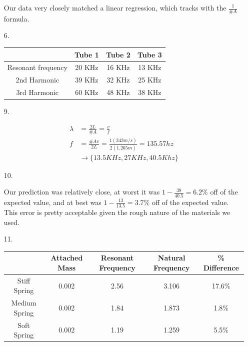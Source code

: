 \documentclass[12pt, letterpaper]{article}
\begin{document}
\begin{itemize}
        Our data very closely matched a linear regression, which tracks with the $\frac{1}{\#A}$ formula.

        \pagebreak
        
        \item [6.]\mbox{}
        
        \begin{center}
            \begin{tabular}{|c|c|c|c|}
                \hline
                & Tube 1 & Tube 2 & Tube 3  \\
                \hline
                Resonant frequency & 20 KHz & 16 KHz & 13 KHz \\
                \hline
                2nd Harmonic & 39 KHz & 32 KHz & 25 KHz \\
                \hline
                3rd Harmonic & 60 KHz & 48 KHz & 38 KHz \\
                \hline
            \end{tabular}
        \end{center}

        \item [9.]
        
        \begin{align*}
            \lambda & = \frac{2L}{\#A} = \frac{v}{f}    \\
            f   & = \frac{\#Av}{2L} 
                = \frac{1(343m/s)}{2(1.265m)} 
                = 135.57 hz                             \\
                & \rightarrow \{13.5KHz, 27KHz, 40.5Khz\}
        \end{align*}

        \item [10.]\mbox{}
        
        Our prediction was relatively close, at worst it was $1 - \frac{38}{40.5} = 6.2\%$ off of the expected value, and at best was $1 - \frac{13}{13.5} = 3.7\%$ off of the expected value. This error is pretty acceptable given the rough nature of the materials we used.
        
        \item[11.]\mbox{}
        
        \begin{center}
            \begin{tabular}{|c|c|c|c|c|}
                \hline
                & Attached Mass & Resonant Frequency & Natural Frequency & \% Difference    \\
                \hline
                Stiff Spring & 0.002 & 2.56 & 3.106 & 17.6\% \\
                \hline
                Medium Spring & 0.002 & 1.84 & 1.873 & 1.8\% \\
                \hline
                Soft Spring & 0.002 & 1.19 & 1.259 & 5.5\% \\
                \hline
            \end{tabular}
        \end{center}


\end{itemize}
\end{document}

